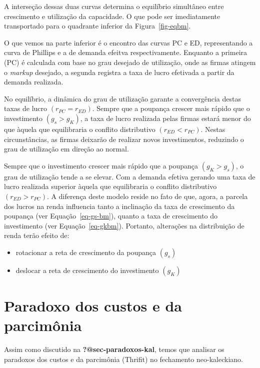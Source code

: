 \documentclass[
  brazilian,
  letterpaper,
  DIV=11,
  numbers=noendperiod]{scrreprt}
\begin{document}
A interseção dessas duas curvas determina o equilíbrio simultâneo entre
crescimento e utilização da capacidade. O que pode ser imediatamente
transportado para o quadrante inferior da Figura~\ref{fig-eqbm}.

O que vemos na parte inferior é o encontro das curvas PC e ED,
representando a curva de Phillips e a de demanda efeitva
respectivamente. Enquanto a primeira (PC) é calculada com base no grau
desejado de utilização, onde as firmas atingem o \emph{markup} desejado,
a segunda registra a taxa de lucro efetivada a partir da demanda
realizada.

No equilíbrio, a dinâmica do grau de utilização garante a convergência
destas taxas de lucro \((r_{PC}=r_{ED}).\) Sempre que a poupança crescer
mais rápido que o investimento \((g_s>g_K)\), a taxa de lucro realizada
pelas firmas estará menor do que àquela que equilibraria o conflito
distributivo \((r_{ED}<r_{PC})\). Nestas circunstâncias, as firmas
deixarão de realizar novos investimentos, reduzindo o grau de utilização
em direção ao normal.

Sempre que o investimento crescer mais rápido que a poupança
\((g_K>g_s)\), o grau de utilização tende a se elevar. Com a demanda
efetiva gerando uma taxa de lucro realizada superior àquela que
equilibraria o conflito distributivo \((r_{ED}>r_{PC})\). A diferença
deste modelo reside no fato de que, agora, a parcela dos lucros na renda
influencia tanto a inclinação da taxa de crescimento da poupança (ver
Equação~\ref{eq-gs-bm}), quanto a taxa de crescimento do investimento
(ver Equação~\ref{eq-gkbm}). Portanto, alterações na distribuição de
renda terão efeito de:

\begin{itemize}
\item
  rotacionar a reta de crescimento da poupança \((g_s)\)
\item
  deslocar a reta de crescimento do investimento \((g_K)\)
\end{itemize}

\section{Paradoxo dos custos e da
parcimônia}\label{paradoxo-dos-custos-e-da-parcimuxf4nia}

Assim como discutido na \textbf{?@sec-paradoxos-kal}, temos que analisar
os paradoxos dos custos e da parcimônia (Thrifit) no fechamento
neo-kaleckiano.
\end{document}
